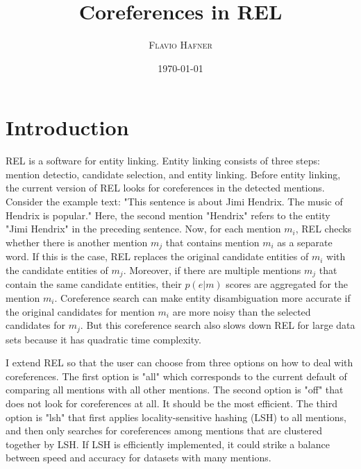 \documentclass[a4paper,11pt]{article}
\numberwithin{equation}{section} %
\begin{document}
\title{Coreferences in REL
}



\author{\textsc{Flavio Hafner}
}

\date{\today}


\clearpage
\maketitle

\tableofcontents



\section{Introduction}

REL is a software for entity linking. Entity linking consists of three steps: mention detectio, candidate selection, and entity linking. Before entity linking, the current version of REL looks for coreferences in the detected mentions. Consider the example text: "This sentence is about Jimi Hendrix. The music of Hendrix is popular." Here, the second mention "Hendrix" refers to the entity "Jimi Hendrix" in the preceding sentence. Now, for each mention $m_i$, REL checks whether there is another mention $m_j$ that contains mention $m_i$ as a separate word. If this is the case, REL replaces the original candidate entities of $m_i$ with the candidate entities of $m_j$. Moreover, if there are multiple mentions $m_j$ that contain the same candidate entities, their $p(e|m)$ scores are aggregated for the mention $m_i$. Coreference search can make entity disambiguation more accurate if the original candidates for mention $m_i$ are more noisy than the selected candidates for $m_j$. 
But this coreference search also slows down REL for large data sets because it has quadratic time complexity.

I extend REL so that the user can choose from three options on how to deal with coreferences. The first option is "all" which corresponds to the current default of comparing all mentions with all other mentions. The second option is "off" that does not look for coreferences at all. It should be the most efficient. The third option is "lsh" that first applies locality-sensitive hashing (LSH) to all mentions, and then only searches for coreferences among mentions that are clustered together by LSH. If LSH is efficiently implemented, it could strike a balance between speed and accuracy for datasets with many mentions. 
\end{document}
